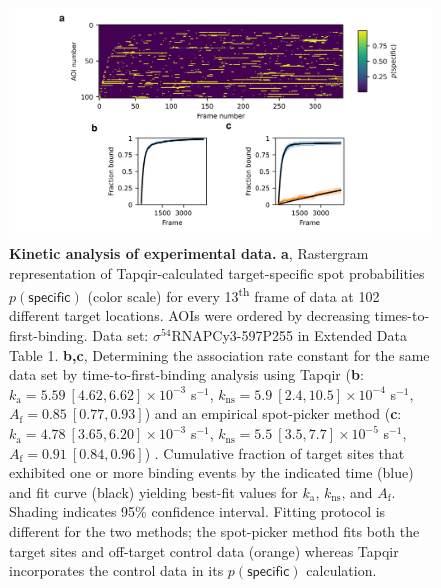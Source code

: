 \begin{figure}[h]
\centering
\includegraphics[width=\textwidth]{figures/figure7/figure7.png}
\caption{\textbf{Kinetic analysis of experimental data.}   \textbf{a}, Rastergram representation of Tapqir-calculated target-specific spot  probabilities $p(\mathsf{specific})$ (color scale) for every 13\textsuperscript{th} frame of data at 102 different target locations.  AOIs were ordered by decreasing times-to-first-binding. Data set: $\sigma^{54}$RNAPCy3-597P255 in Extended Data Table 1. \textbf{b,c}, Determining the association rate constant for the same data set by  time-to-first-binding analysis using Tapqir (\textbf{b}: $k_\mathrm{a} = 5.59 \: [4.62, 6.62] \times 10^{-3}$ s$^{-1}$, $k_\mathrm{ns} = 5.9 \: [2.4, 10.5] \times 10^{-4}$ s$^{-1}$, $A_\mathrm{f} = 0.85 \: [0.77, 0.93]$) and an empirical spot-picker method (\textbf{c}: $k_\mathrm{a} = 4.78 \: [3.65, 6.20] \times 10^{-3}$ s$^{-1}$, $k_\mathrm{ns} = 5.5 \: [3.5, 7.7] \times 10^{-5}$ s$^{-1}$, $A_\mathrm{f} = 0.91 \: [0.84, 0.96]$) \cite{Friedman2013-sf}.   Cumulative fraction of target sites that exhibited one or more binding events by the indicated time (blue) and fit curve (black) yielding best-fit values for $k_\mathrm{a}$, $k_\mathrm{ns}$, and $A_\mathrm{f}$. Shading indicates 95\% confidence interval. Fitting protocol is different for the two methods; the spot-picker method fits both the target sites and off-target control data (orange) whereas Tapqir incorporates the control data in its $p(\mathsf{specific})$ calculation.
}
\label{fig:experimental_data}
\end{figure}